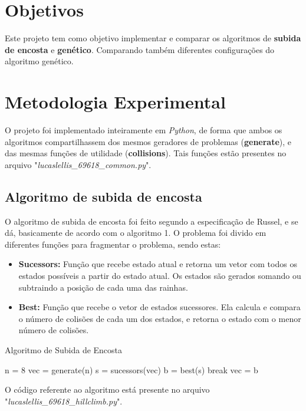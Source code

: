 \documentclass[conference]{IEEEtran}
\begin{document}

\section{Objetivos}
Este projeto tem como objetivo implementar e comparar os algoritmos de \textbf{subida de encosta} e \textbf{genético}.
Comparando também diferentes configurações do algoritmo genético.
\section{Metodologia Experimental}
O projeto foi implementado inteiramente em \textit{Python}, de forma que ambos os algoritmos compartilhassem dos mesmos
geradores de problemas (\textbf{generate}), e das mesmas funções de utilidade (\textbf{collisions}). Tais funções estão presentes no arquivo "\textit{lucaslellis\_69618\_common.py}".
\subsection{Algoritmo de subida de encosta}
O algoritmo de subida de encosta foi feito segundo a especificação de Russel\cite{norvig2014inteligencia}, e se dá, basicamente de acordo com o algoritmo 1. O problema foi divido em diferentes funções para fragmentar o problema, sendo estas:
\begin{itemize}
	\item \textbf{Sucessors:} Função que recebe estado atual e retorna um vetor com todos os estados possíveis a partir
	do estado atual. Os estados são gerados somando ou subtraindo a posição de cada uma das rainhas.
	\item \textbf{Best:} Função que recebe o vetor de estados sucessores. Ela calcula e compara o número de colisões
	de cada um dos estados, e retorna o estado com o menor número de colisões.
\end{itemize}
\begin{algorithm}
\caption{Algoritmo de Subida de Encosta}
\begin{algorithmic}[1]
	\STATE n = 8 
	\STATE vec = generate(n)
	\STATE s = sucessors(vec)
	\STATE b = best(s)
	\STATE break
	\ELSE
		\STATE	vec = b
	\ENDIF
	\ENDWHILE
\end{algorithmic} 
\end{algorithm}
O código referente ao algoritmo está presente no arquivo "\textit{lucaslellis\_69618\_hillclimb.py}". 
\end{document}
